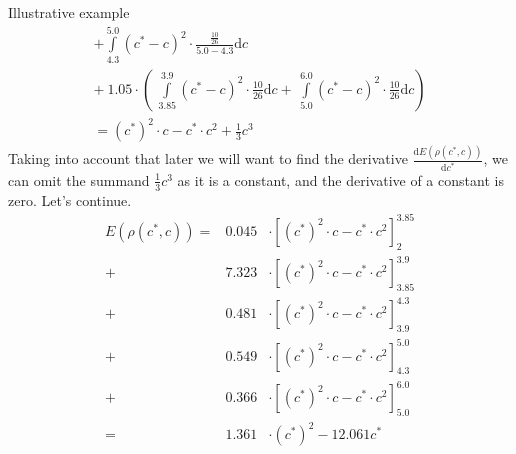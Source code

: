 \begin{subsection}{Illustrative example}
\begin{gather*}
+ \int\limits_{4.3}^{5.0} (c^{*}-c)^{2} \cdot \frac{\frac{10}{26}}{5.0-4.3} \mathrm{d}c \\
+ \ 1.05 \cdot \left( \ \int\limits_{3.85}^{3.9} (c^{*}-c)^{2} \cdot \frac{10}{26} \mathrm{d}c + \
\int\limits_{5.0}^{6.0} (c^{*}-c)^{2} \cdot \frac{10}{26} \mathrm{d}c \right) \\
=(c^{*})^{2} \cdot c - c^{*} \cdot c^{2} + \frac{1}{3} c^{3}
\end{gather*}
Taking into account that later we will want to find the derivative $\frac{\mathrm{d}E(\rho(c^{*},c))}{\mathrm{d}c^{*}}$, we can omit the summand $\frac{1}{3} c^{3}$ as it is a constant, and the derivative of a constant is zero. Let's continue.
\begin{eqnarray*}
E(\rho(c^{*},c)) =& 0.045 & \cdot\left[ (c^{*})^{2} \cdot c - c^{*} \cdot c^{2} \right]_{2}^{3.85}  \\
+ & 7.323 &\cdot\left[ (c^{*})^{2} \cdot c - c^{*} \cdot c^{2} \right]_{3.85}^{3.9} \\
+ & 0.481 &\cdot\left[ (c^{*})^{2} \cdot c - c^{*} \cdot c^{2} \right]_{3.9}^{4.3}  \\
+ & 0.549 &\cdot\left[ (c^{*})^{2} \cdot c - c^{*} \cdot c^{2} \right]_{4.3}^{5.0}  \\
+ & 0.366 &\cdot\left[ (c^{*})^{2} \cdot c - c^{*} \cdot c^{2} \right]_{5.0}^{6.0}  \\
= & 1.361 &\cdot(c^{*})^{2}-12.061c^{*}
\end{eqnarray*}


\end{subsection}
